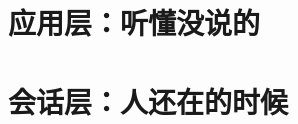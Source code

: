 \documentclass{hci-manual}
\begin{document}
\part{应用层：听懂没说的}







\part{会话层：人还在的时候}




\appendix



\end{document}
